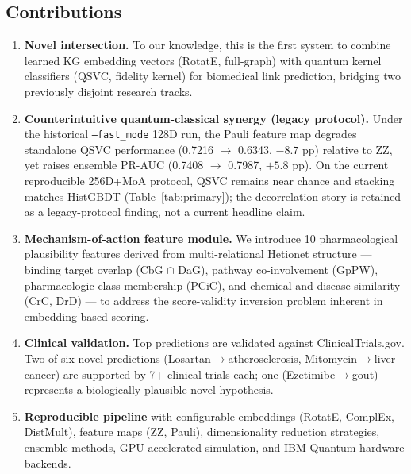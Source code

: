 \documentclass[10pt,twocolumn]{article}
\begin{document}
\subsection{Contributions}

\begin{enumerate}[leftmargin=*, label=\arabic*.]

\item \textbf{Novel intersection.} To our knowledge, this is the first system to combine learned KG embedding vectors (RotatE, full-graph) with quantum kernel classifiers (QSVC, fidelity kernel) for biomedical link prediction, bridging two previously disjoint research tracks.

\item \textbf{Counterintuitive quantum-classical synergy (legacy protocol).} Under the historical \texttt{--fast\_mode} 128D run, the Pauli feature map degrades standalone QSVC performance (0.7216 $\to$ 0.6343, $-8.7$ pp) relative to ZZ, yet raises ensemble PR-AUC (0.7408 $\to$ 0.7987, $+5.8$ pp). On the current reproducible 256D+MoA protocol, QSVC remains near chance and stacking matches HistGBDT (Table~\ref{tab:primary}); the decorrelation story is retained as a legacy-protocol finding, not a current headline claim.

\item \textbf{Mechanism-of-action feature module.} We introduce 10 pharmacological plausibility features derived from multi-relational Hetionet structure --- binding target overlap (CbG $\cap$ DaG), pathway co-involvement (GpPW), pharmacologic class membership (PCiC), and chemical and disease similarity (CrC, DrD) --- to address the score-validity inversion problem inherent in embedding-based scoring.

\item \textbf{Clinical validation.} Top predictions are validated against ClinicalTrials.gov. Two of six novel predictions (Losartan$\to$atherosclerosis, Mitomycin$\to$liver cancer) are supported by 7+ clinical trials each; one (Ezetimibe$\to$gout) represents a biologically plausible novel hypothesis.

\item \textbf{Reproducible pipeline} with configurable embeddings (RotatE, ComplEx, DistMult), feature maps (ZZ, Pauli), dimensionality reduction strategies, ensemble methods, GPU-accelerated simulation, and IBM Quantum hardware backends.

\end{enumerate}
\end{document}
